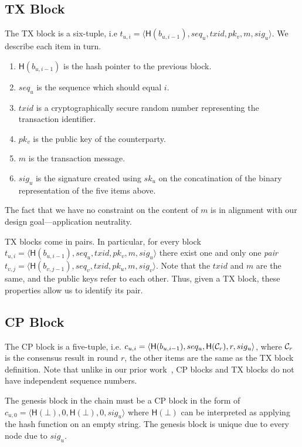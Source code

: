 \subsection{TX Block}
The TX block is a six-tuple, i.e $t_{u, i} = \langle \textsf{H}(b_{u, i - 1}), seq_u, txid, pk_v, m, sig_u \rangle$.
We describe each item in turn.
\begin{enumerate}
\item $\textsf{H}(b_{u, i - 1})$ is the hash pointer to the previous block.
\item $seq_u$ is the sequence which should equal $i$.
\item $txid$ is a cryptographically secure random number representing the transaction identifier.
\item $pk_v$ is the public key of the counterparty.
\item $m$ is the transaction message.
\item $sig_u$ is the signature created using $sk_u$ on the concatination of the binary representation of the five items above.
\end{enumerate}
The fact that we have no constraint on the content of $m$ is in alignment with our design goal---application neutrality.

TX blocks come in pairs.
In particular, for every block $t_{u, i} = \langle \textsf{H}(b_{u, i - 1}), seq_u, txid, pk_v, m, sig_u \rangle$
there exist one and only one \emph{pair} $t_{v, j} = \langle \textsf{H}(b_{v, j - 1}), seq_v, txid, pk_u, m, sig_v \rangle$.
Note that the $txid$ and $m$ are the same, and the public keys refer to each other.
Thus, given a TX block, these properties allow us to identify its pair.


\subsection{CP Block}

The CP block is a five-tuple, 
i.e. $c_{u, i} = \langle \textsf{H}(b_{u, i-1}), seq_u, \textsf{H}(\mathcal{C}_r), r, sig_u \rangle$,
where $\mathcal{C}_r$ is the consensus result in round $r$, the other items are the same as the TX block definition.
Note that unlike in our prior work~\cite{implicitconsensus}, CP blocks and TX blocks do not have independent sequence numbers.

The genesis block in the chain must be a CP block in the form of
$c_{u, 0} = \langle \textsf{H}(\bot), 0,  \textsf{H}(\bot), 0, sig_u \rangle$
where $\textsf{H}(\bot)$ can be interpreted as applying the hash function on an empty string.
The genesis block is unique due to every node due to $sig_u$.


